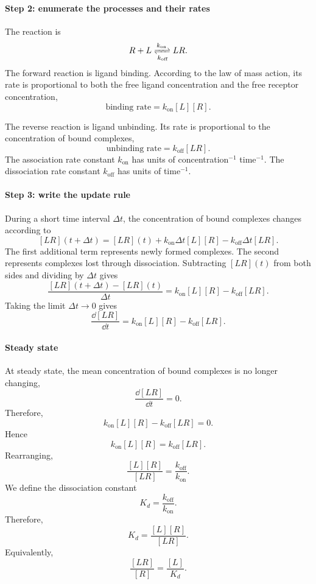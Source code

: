 \paragraph{Step 2: enumerate the processes and their rates}
The reaction is
\[
    R + L \xrightleftharpoons[k_{\mathrm{off}}]{k_{\mathrm{on}}} LR.
\]
The forward reaction is ligand binding.
According to the law of mass action, its rate is proportional to both the free ligand concentration and the free receptor concentration,
\[
    \text{binding rate} = k_{\mathrm{on}}[L][R].
\]

The reverse reaction is ligand unbinding.
Its rate is proportional to the concentration of bound complexes,
\[
    \text{unbinding rate} = k_{\mathrm{off}}[LR].
\]
The association rate constant $k_{\mathrm{on}}$ has units of concentration$^{-1}$ time$^{-1}$.
The dissociation rate constant $k_{\mathrm{off}}$ has units of time$^{-1}$.
% 
% 
\paragraph{Step 3: write the update rule}
During a short time interval $\Delta t$, the concentration of bound complexes changes according to
\[
    [LR](t+\Delta t) = [LR](t) + k_{\mathrm{on}}\Delta t[L][R] - k_{\mathrm{off}}\Delta t[LR].
\]
The first additional term represents newly formed complexes.
The second represents complexes lost through dissociation.
Subtracting $[LR](t)$ from both sides and dividing by $\Delta t$ gives
\[
    \frac{[LR](t+\Delta t)-[LR](t)}{\Delta t} = k_{\mathrm{on}}[L][R] - k_{\mathrm{off}}[LR].
\]
Taking the limit $\Delta t\rightarrow0$ gives
\[
    \boxed{\frac{\dd[LR]}{\dd t} = k_{\mathrm{on}}[L][R] - k_{\mathrm{off}}[LR].}
\]
% 
% 
\paragraph{Steady state}
At steady state, the mean concentration of bound complexes is no longer changing,
\[
    \frac{\dd[LR]}{\dd t} = 0.
\]
Therefore,
\[
    k_{\mathrm{on}}[L][R] - k_{\mathrm{off}}[LR] = 0.
\]
Hence
\[
    k_{\mathrm{on}}[L][R] = k_{\mathrm{off}}[LR].
\]
Rearranging,
\[
    \frac{[L][R]}{[LR]} = \frac{k_{\mathrm{off}}}{k_{\mathrm{on}}}.
\]
We define the dissociation constant
\[
    \boxed{K_d = \frac{k_{\mathrm{off}}}{k_{\mathrm{on}}}.}
\]
Therefore,
\[
    K_d = \frac{[L][R]}{[LR]}.
\]
Equivalently,
\[
    \frac{[LR]}{[R]} = \frac{[L]}{K_d}.
\]
% 
% 
